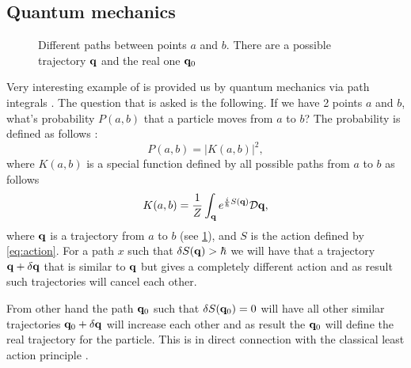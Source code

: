 \subsection{Quantum mechanics}

\begin{figure}
  \centering
  \caption{Different paths between points $a$ and $b$. There are a possible
    trajectory ${\bf q}$ and the real one ${\bf q}_0$}
  \label{fig:pathintegral}
\end{figure}


Very interesting example of  is provided us by
quantum mechanics via path integrals \cite{feynman2010quantum}. The
question that is asked is the following. If we have 2 points $a$ and
$b$, what's probability $P(a, b)$ that a particle moves from $a$ to
$b$? The probability is defined as follows \cite{feynman2010quantum}:
\[
P(a,b) = \left|K(a,b)\right|^2,
\]
where $K(a,b)$ is a special function defined by all possible paths
from $a$ to $b$ as follows
\[
K(a,b) = \frac{1}{Z} \int_{\bf q} e^{\frac{i}{\hbar}S({\bf q})} \mathcal{D}{\bf q},
\]
where ${\bf q}$ is a trajectory from $a$ to $b$ (see
\cref{fig:pathintegral}), and $S$ is the action 
defined by \eqref{eq:action}. For a path $x$ such that $\delta S({\bf q}) >
\hbar$ we will have that a trajectory ${\bf q} + \delta {\bf q}$ that is similar
to ${\bf q}$ but gives a completely different action and as result such
trajectories will cancel each other.   

From other hand the path ${\bf q}_0$ such that
$\delta S({\bf q}_0) = 0$ will have all other similar trajectories ${\bf q}_0 +
\delta {\bf q}$ will increase each other and as result the ${\bf q}_0$ will define
the real trajectory for the particle. This is in direct connection
with the classical least action principle
\cite{wiki:least_action_principle}.  

